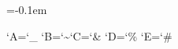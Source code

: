 \def\url{\begingroup\begingroup\allowurlchars\urlaux}
\def\urlaux#1{\urlauxarg{#1}\linkurlauxB{\displayurl}}

\def\linkurl{\begingroup\begingroup\allowurlchars\linkurlaux}
\def\linkurlaux#1{\urlauxarg{#1}\linkurlauxB}
\def\linkurlauxB#1{%
	\leavevmode
	\ifclickable
		{%
			\urlplainascii
			\pdfstartlink\commonlinkargs user {/Subtype/Link /A << /Type/Action /S/URI /URI(\tmpb) >>}\relax
		}%
	\fi
	#1%
	\ifclickable
		\pdfendlink
	\fi
	\endgroup		%
}

\def\allowurlchars{\catcode`\%=12\catcode`\#=12\relax}

\def\urlauxarg#1{%
	\endgroup		%
	\toks0={#1}\edef\tmpb{\the\toks0}%
	\replacestrings{//}{\urlslashslash}%
	\replacestrings{_}{\urlunderscore}%
	\replacestrings{~}{\urltilde}%
	\replacestrings{/}{\urlslash}%
	\replacestrings{?}{\urlquestion}%
	\replacestrings{&}{\urlamp}%
	\replacestrings{=}{\urlequal}%
	\replacestrings{-}{\urlminus}%
}

\let\urlprefix\it
\let\urlsuffix\/

\def\urlslashslash{/\kern\urlinterslashkern/}
\def\urlunderscore{\_}
\def\urltilde{{\tt\char126}}
\def\urlslash{/\penalty100\relax}
\def\urlquestion{?\penalty100\relax}
\def\urlamp{\&\penalty100\relax}
\def\urlequal{=\penalty100\relax}
\def\urlminus{\hbox{-}}
\def\urlhack#1{#1}

\newdimen\urlinterslashkern
\urlinterslashkern=-0.1em

{
\lccode`A=`\_
\lccode`B=`\~
\lccode`C=`\&
\lccode`D=`\%
\lccode`E=`\#
\lowercase{\gdef\urlplainascii{%
	\def\urlslashslash{//}%
	\def\urlunderscore{A}%
	\def\urltilde{B}%
	\def\urlslash{/}%
	\def\urlquestion{?}%
	\def\urlamp{C}%
	\def\urlequal{=}%
	\def\urlminus{-}%
	\def\%{D}%
	\def\#{E}%
	\def\\{}%
	\def\urlhack##1{}%
}}}

\def\displayurl{{\urlprefix\tmpb\urlsuffix}}
